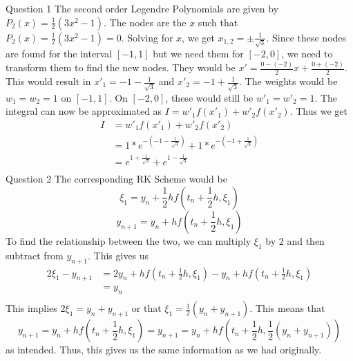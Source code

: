 \documentclass[12pt]{exam}
\begin{document}
\begin{questions}
\question Question 1 \newline
The second order Legendre Polynomials are given by $P_2(x) = \frac{1}{2}(3x^2-1)$. The nodes are the $x$ such that $P_2(x) = \frac{1}{2}(3x^2-1) =0$. Solving for $x$, we get $x_{1,2} = \pm \frac{1}{\sqrt{3}}$. Since these nodes are found for the interval $[-1,1]$ but we need them for $[-2,0]$, we need to transform them to find the new nodes. They would be $x' = \frac{0-(-2)}{2}x+\frac{0+(-2)}{2}$. This would result in $x'_1 = -1-\frac{1}{\sqrt{3}}$ and $x'_2 = -1+\frac{1}{\sqrt{3}}$. The weights would be $w_1=w_2=1$ on $[-1,1]$. On $[-2,0]$, these would still be $w'_1 = w'_2=1$. The integral can now be approximated as $I = w'_1f(x'_1)+w'_2f(x'_2)$. Thus we get 
\begin{align*}
    I &= w'_1f(x'_1)+w'_2f(x'_2)\\
    &= 1*e^{-(-1-\frac{1}{\sqrt{3}})}+1*e^{-(-1+\frac{1}{\sqrt{3}})}\\
    &= e^{1+\frac{1}{\sqrt{3}}}+e^{1-\frac{1}{\sqrt{3}}}\\
\end{align*}
\question Question 2\newline
The corresponding RK Scheme would be \[\xi_1 = y_n + \frac{1}{2}hf(t_n+\frac{1}{2}h, \xi_1) \]
\[y_{n+1} = y_n + hf(t_n+\frac{1}{2}h, \xi_1)\]
To find the relationship between the two, we can multiply $\xi_1$ by $2$ and then subtract from $y_{n+1}$. This gives us 
\begin{align*}
    2\xi_1-y_{n+1} &= 2y_n+hf(t_n+\frac{1}{2}h,\xi_1)-y_n+hf(t_n+\frac{1}{2}h,\xi_1)\\
    &=y_n\\
\end{align*}
This implies $2\xi_1 = y_n+y_{n+1}$ or that $\xi_1=\frac{1}{2}(y_n+y_{n+1})$. This means that \[y_{n+1} = y_n + hf(t_n+\frac{1}{2}h, \xi_1) = y_{n+1} = y_n + hf(t_n+\frac{1}{2}h,\frac{1}{2}(y_n+y_{n+1}) )\] as intended. Thus, this gives us the same information as we had originally. 

\end{questions}
\end{document}
